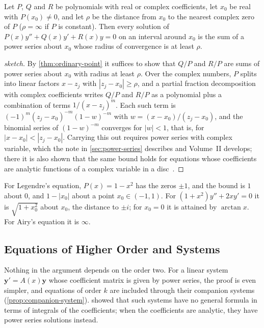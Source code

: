 \begin{theorem}
\label{thm:rational-coefficients}
Let $P$, $Q$ and $R$ be polynomials with real or complex coefficients, let $x_0$ be real with $P(x_0)\ne0$, and let $\rho$ be the distance from $x_0$ to the nearest complex zero of $P$ ($\rho=\infty$ if $P$ is constant). Then every solution of $P(x)y''+Q(x)y'+R(x)y=0$ on an interval around $x_0$ is the sum of a power series about $x_0$ whose radius of convergence is at least $\rho$.
\end{theorem}

\begin{proof}[sketch]
By \cref{thm:ordinary-point} it suffices to show that $Q/P$ and $R/P$ are sums of power series about $x_0$ with radius at least $\rho$. Over the complex numbers, $P$ splits into linear factors $x-z_j$ with $|z_j-x_0|\ge\rho$, and a partial fraction decomposition with complex coefficients writes $Q/P$ and $R/P$ as a polynomial plus a combination of terms $1/(x-z_j)^m$. Each such term is $(-1)^m(z_j-x_0)^{-m}(1-w)^{-m}$ with $w=(x-x_0)/(z_j-x_0)$, and the binomial series of $(1-w)^{-m}$ converges for $|w|<1$, that is, for $|x-x_0|<|z_j-x_0|$. Carrying this out requires power series with complex variable, which the note in \cref{sec:power-series} describes and Volume~II develops; there it is also shown that the same bound holds for equations whose coefficients are analytic functions of a complex variable in a disc~\cite{hille1976}.
\end{proof}

For Legendre's equation, $P(x)=1-x^2$ has the zeros $\pm1$, and the bound is $1$ about $0$, and $1-|x_0|$ about a point $x_0\in(-1,1)$. For $(1+x^2)y''+2xy'=0$ it is $\sqrt{1+x_0^2}$ about $x_0$, the distance to $\pm i$; for $x_0=0$ it is attained by $\arctan x$. For Airy's equation it is $\infty$.

\subsection{Equations of Higher Order and Systems}

Nothing in the argument depends on the order two. For a linear system $\mathbf y'=A(x)\mathbf y$ whose coefficient matrix is given by power series, the proof is even simpler, and equations of order $k$ are included through their companion systems (\cref{prop:companion-system}).  showed that such systems have no general formula in terms of integrals of the coefficients; when the coefficients are analytic, they have power series solutions instead.

